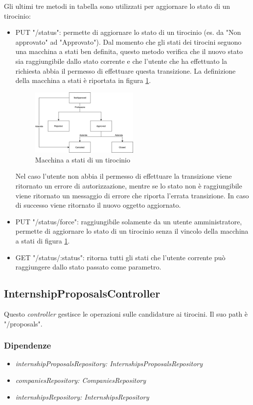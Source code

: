 Gli ultimi tre metodi in tabella sono utilizzati per aggiornare lo stato di un tirocinio:
\begin{itemize}
	\item PUT "/status": permette di aggiornare lo stato di un tirocinio (es. da "Non approvato" ad "Approvato"). Dal momento che gli stati dei tirocini seguono una macchina a stati ben definita, questo metodo verifica che il nuovo stato sia raggiungibile dallo stato corrente e che l'utente che ha effettuato la richiesta abbia il permesso di effettuare questa transizione. La definizione della macchina a stati è riportata in figura \ref{fig:internship-state-machine}.
	 \begin{figure}[H] 
		\centering    
		\includegraphics[width=0.5\textwidth]{Chapter4/Figs/internship-state-machine}
		\caption[Macchina a stati di un tirocinio]{Macchina a stati di un tirocinio}
		\label{fig:internship-state-machine}
	\end{figure}
	Nel caso l'utente non abbia il permesso di effettuare la transizione viene ritornato un errore di autorizzazione, mentre se lo stato non è raggiungibile viene ritornato un messaggio di errore che riporta l'errata transizione. In caso di successo viene ritornato il nuovo oggetto aggiornato.
	\item PUT "/status/force": raggiungibile solamente da un utente amministratore, permette di aggiornare lo stato di un tirocinio senza il vincolo della macchina a stati di figura \ref{fig:internship-state-machine}.
	\item GET "/status/:status": ritorna tutti gli stati che l'utente corrente può raggiungere dallo stato passato come parametro.
\end{itemize}

\subsection{InternshipProposalsController}

Questo \textit{controller} gestisce le operazioni sulle candidature ai tirocini. Il suo path è "/proposals".
\subsubsection{Dipendenze}
\begin{itemize}[itemsep=0pt]
	\item \textit{internshipProposalsRepository: InternshipsProposalsRepository}
	\item \textit{companiesRepository: CompaniesRepository}
	\item \textit{internshipsRepository: InternshipsRepository}
\end{itemize}

